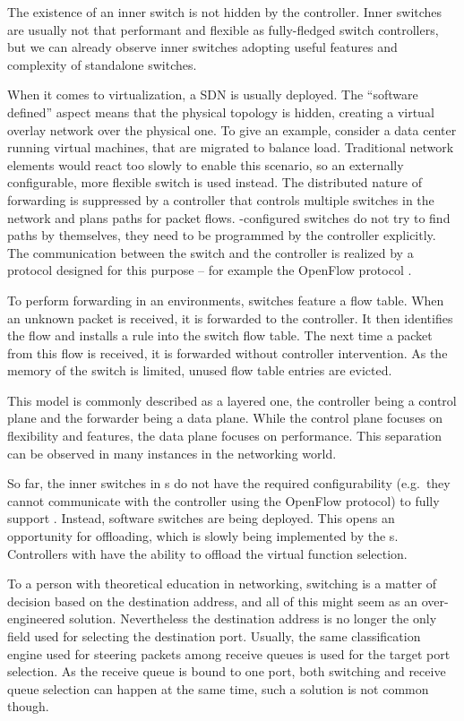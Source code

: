The existence of an inner switch is not hidden by the controller. Inner switches
are usually not that performant and flexible as fully-fledged switch controllers,
but we can already observe inner switches adopting useful features and
complexity of standalone switches.

When it comes to virtualization, a \acrfull{SDN} is usually
deployed. The ``software defined'' aspect means that the physical topology is
hidden, creating a virtual overlay network over the physical one.
To give an example, consider a data center running virtual machines, that are
migrated to balance load. Traditional network elements would react too
slowly to enable this scenario, so an externally configurable, more flexible
switch is used instead. The distributed nature of forwarding is suppressed by
a controller that controls multiple switches in the network and plans paths
for packet flows. -configured switches do not try to find paths by
themselves, they need to be programmed by the controller explicitly. The
communication between the switch and the controller is realized by a protocol
designed for this purpose -- for example the OpenFlow protocol \cite{openflow}.

To perform forwarding in an  environments, switches feature a flow table. When
an unknown packet is received, it is forwarded to the controller. It then
identifies the flow and installs a rule into the switch flow table. The next time
a packet from this flow is received, it is forwarded without controller
intervention. As the memory of the switch is limited, unused flow table entries
are evicted.

This model is commonly described as a layered one, the controller being
a control plane and the forwarder being a data plane. While the control plane
focuses on flexibility and features, the data plane focuses on performance. This
separation can be observed in many instances in the networking world.

So far, the inner switches in s do not have the required configurability
(e.g.\ they cannot communicate with the controller using the OpenFlow protocol)
to fully support . Instead, software switches are being deployed. This
opens an opportunity for offloading, which is slowly being implemented by the
s. Controllers with  have the ability to offload the virtual
function selection.

To a person with theoretical education in networking, switching is a matter of
decision based on the destination  address, and all of this might seem
as an over-engineered solution. Nevertheless the destination  address is no
longer the only field used for selecting the destination port. Usually, the same
classification engine used for steering packets among receive queues is used
for the target port selection. As the receive queue is bound to one port, both
switching and receive queue selection can happen at the same time, such
a solution is not common though.

